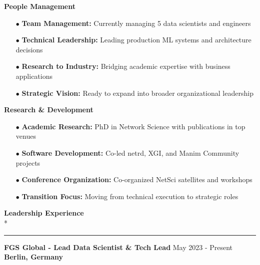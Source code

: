 \documentclass[11pt,a4paper]{article}
\newlength{\spacesm}    \setlength{\spacesm}{11pt}     %
\newlength{\spacexl}    \setlength{\spacexl}{38pt}     %
\newcommand{\bodytext}[1]{%
    {\fontsize{10pt}{14pt}\selectfont\color{charcoal} #1}%
}
\newcommand{\bodytextbold}[1]{%
    {\fontsize{10pt}{14pt}\selectfont\color{charcoal}\bfseries #1}%
}
\newcommand{\microtext}[1]{%
    {\fontsize{8pt}{11pt}\selectfont\color{mediumgray} #1}%
}
\newcommand{\sectiontitle}[1]{%
    \needspace{4\baselineskip}%
    \vspace{\spacexl}%
    {\fontsize{12pt}{14pt}\selectfont\color{navy}\bfseries #1}\\*%
    \vspace{1pt}%
    {\color{gold}\rule{20pt}{1pt}}%
    \vspace{0pt}%
}
\newcommand{\goldbullet}{{\color{gold}$\bullet$}\space}
\newcommand{\jobduration}[1]{%
    {\fontspec{JetBrains Mono}\microtext{#1}}
}
\newcommand{\companyname}[1]{%
    {\color{darkgray}\bfseries #1}
}
\begin{document}
\setlength{\multicolsep}{0pt}
\begin{multicols}{2}
\raggedcolumns
\bodytextbold{People Management}
\vspace{2pt}
\begin{itemize}[leftmargin=15pt,itemindent=0pt,labelwidth=10pt,labelsep=5pt,itemsep=1pt,parsep=0pt,topsep=0pt,partopsep=0pt]
    \item[\goldbullet] \bodytext{\textbf{Team Management:} Currently managing 5 data scientists and engineers}
    \item[\goldbullet] \bodytext{\textbf{Technical Leadership:} Leading production ML systems and architecture decisions}
    \item[\goldbullet] \bodytext{\textbf{Research to Industry:} Bridging academic expertise with business applications}
    \item[\goldbullet] \bodytext{\textbf{Strategic Vision:} Ready to expand into broader organizational leadership}
\end{itemize}

\columnbreak

\bodytextbold{Research \& Development}
\vspace{2pt}
\begin{itemize}[leftmargin=15pt,itemindent=0pt,labelwidth=10pt,labelsep=5pt,itemsep=1pt,parsep=0pt,topsep=0pt,partopsep=0pt]
    \item[\goldbullet] \bodytext{\textbf{Academic Research:} PhD in Network Science with publications in top venues}
    \item[\goldbullet] \bodytext{\textbf{Software Development:} Co-led netrd, XGI, and Manim Community projects}
    \item[\goldbullet] \bodytext{\textbf{Conference Organization:} Co-organized NetSci satellites and workshops}
    \item[\goldbullet] \bodytext{\textbf{Transition Focus:} Moving from technical execution to strategic roles}
\end{itemize}
\end{multicols}

\sectiontitle{Leadership Experience}
\vspace{\spacesm}

\bodytext{\textbf{FGS Global - Lead Data Scientist \& Tech Lead}} \hfill \jobduration{May 2023 - Present}\\
\companyname{Berlin, Germany}
\end{document}
